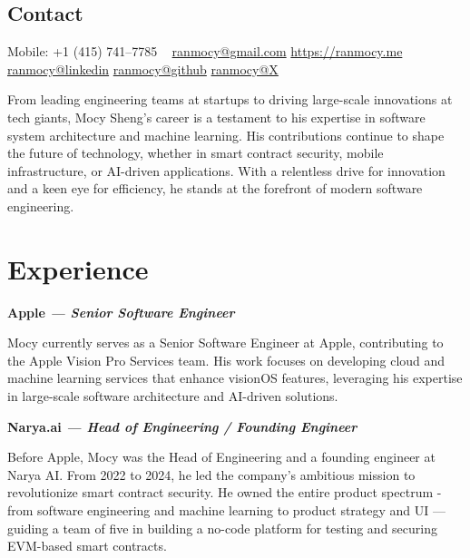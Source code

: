 \documentclass[]{friggeri-cv}
\begin{document}


\begin{aside} %
  \section{Contact}
  Mobile:
  +1 (415) 741--7785
  ~
  \href{mailto:ranmocy+cv@gmail.com}{ranmocy@gmail.com}
  \href{https://ranmocy.me}{https://ranmocy.me}
  \href{https://www.linkedin.com/in/ranmocy}{ranmocy@linkedin}
  \href{https://github.com/ranmocy}{ranmocy@github}
  \href{https://twitter.com/ranmocy}{ranmocy@X}
\end{aside}

From leading engineering teams at startups to driving large-scale innovations at tech giants, 
Mocy Sheng's career is a testament to his expertise in software system architecture and machine learning.
His contributions continue to shape the future of technology, 
whether in smart contract security, mobile infrastructure, or AI-driven applications. 
With a relentless drive for innovation and a keen eye for efficiency, 
he stands at the forefront of modern software engineering.


\section{Experience}

\textbf{Apple \emph{--- Senior Software Engineer}}

Mocy currently serves as a Senior Software Engineer at Apple, contributing to the Apple Vision Pro Services team.
His work focuses on developing cloud and machine learning services that enhance visionOS features,
leveraging his expertise in large-scale software architecture and AI-driven solutions.

\textbf{Narya.ai \emph{--- Head of Engineering / Founding Engineer}}

Before Apple, Mocy was the Head of Engineering and a founding engineer at Narya AI.
From 2022 to 2024, he led the company's ambitious mission to revolutionize smart contract security.
He owned the entire product spectrum - from software engineering and machine learning to product strategy and UI — 
guiding a team of five in building a no-code platform for testing and securing EVM-based smart contracts.
\end{document}

